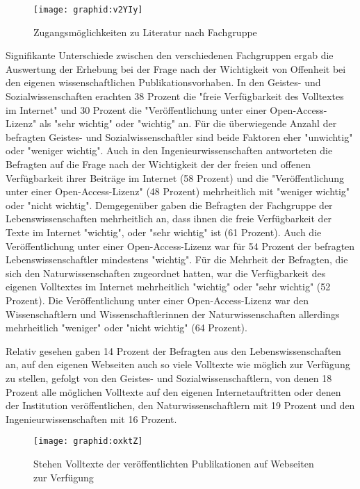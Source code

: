 \begin{figure}[h!]
\texttt{[image: graphid:v2YIy]}
\caption{Zugangsmöglichkeiten zu Literatur nach Fachgruppe}
\end{figure}

Signifikante Unterschiede zwischen den verschiedenen Fachgruppen ergab die Auswertung der Erhebung bei der Frage nach der Wichtigkeit von Offenheit bei den eigenen wissenschaftlichen Publikationsvorhaben. In den Geistes- und Sozialwissenschaften erachten 38 Prozent die "freie Verfügbarkeit des Volltextes im Internet" und 30 Prozent die "Veröffentlichung unter einer Open-Access-Lizenz" als "sehr wichtig" oder "wichtig" an. Für die überwiegende Anzahl der befragten Geistes- und Sozialwissenschaftler sind beide Faktoren eher "unwichtig" oder "weniger wichtig". Auch in den Ingenieurwissenschaften antworteten die Befragten auf die Frage nach der Wichtigkeit der der freien und offenen Verfügbarkeit ihrer Beiträge im Internet (58 Prozent) und die "Veröffentlichung unter einer Open-Access-Lizenz" (48 Prozent) mehrheitlich mit "weniger wichtig" oder "nicht wichtig". Demgegenüber gaben die Befragten der Fachgruppe der Lebenswissenschaften mehrheitlich an, dass ihnen die freie Verfügbarkeit der Texte im Internet "wichtig", oder "sehr wichtig" ist (61 Prozent). Auch die Veröffentlichung unter einer Open-Access-Lizenz war für 54 Prozent der befragten Lebenswissenschaftler mindestens "wichtig". Für die Mehrheit der Befragten, die sich den Naturwissenschaften zugeordnet hatten, war die Verfügbarkeit des eigenen Volltextes im Internet mehrheitlich "wichtig" oder "sehr wichtig" (52 Prozent). Die Veröffentlichung unter einer Open-Access-Lizenz war den Wissenschaftlern und Wissenschaftlerinnen der Naturwissenschaften allerdings mehrheitlich "weniger" oder "nicht wichtig" (64 Prozent).

Relativ gesehen gaben 14 Prozent der Befragten aus den Lebenswissenschaften an, auf den eigenen Webseiten auch so viele Volltexte wie möglich zur Verfügung zu stellen, gefolgt von den Geistes- und Sozialwissenschaftlern, von denen 18 Prozent alle möglichen Volltexte auf den eigenen Internetauftritten oder denen der Institution veröffentlichen, den Naturwissenschaftlern mit 19 Prozent und den Ingenieurwissenschaften mit 16 Prozent.

\begin{figure}[h!]
\texttt{[image: graphid:oxktZ]}
\caption{Stehen Volltexte der veröffentlichten Publikationen auf Webseiten zur Verfügung}
\end{figure}


